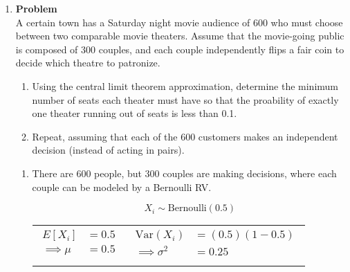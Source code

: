 \documentclass[12pt]{article}
\newenvironment{Ex}{\textbf{Problem}\vspace{.75em}\\}{}
\begin{document}
\begin{enumerate}
\item
  \begin{Ex}
    A certain town has a Saturday night movie audience of 600 who must
    choose between two comparable movie theaters. Assume that the
    movie-going public is composed of 300 couples, and each couple
    independently flips a fair coin to decide which theatre to
    patronize.
    \begin{enumerate}
    \item Using the central limit theorem approximation, determine the
      minimum number of seats each theater must have so that the
      proability of exactly one theater running out of seats is less
      than 0.1.
    \item Repeat, assuming that each of the 600 customers makes an
      independent decision (instead of acting in pairs).
    \end{enumerate}
    \begin{solution} \hfill
      \begin{enumerate}
      \item There are 600 people, but 300 couples are making
        decisions, where each couple can be modeled by a Bernoulli RV.
        \begin{table}[H]
          \begin{equation}
            \label{eq:3a-rv}
            X_i\sim\text{Bernoulli}(0.5)
          \end{equation}
          \begin{tabularx}{\linewidth}{XX}
            \begin{equation}
              \label{eq:3a-mean}
              \begin{aligned}
                E[X_i] &= 0.5 \\
                \implies \mu &= 0.5 \\
              \end{aligned}
            \end{equation}
            &
            \begin{equation}
              \label{eq:3a-var}
              \begin{aligned}
                \text{Var}(X_i) &= (0.5)(1-0.5) \\
                \implies \sigma^2 &= 0.25 \\
              \end{aligned}
            \end{equation}
          \end{tabularx}

\end{table}
\end{enumerate}
\end{solution}
\end{Ex}
\end{enumerate}
\end{document}
